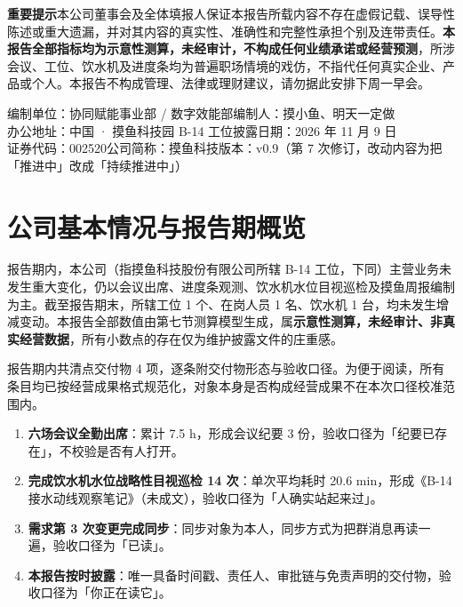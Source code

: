 \documentclass[11pt,a4paper]{article}
\begin{document}
\begin{titlepage}
\vspace{10mm}
\begin{minipage}{0.88\textwidth}\small 
\textcolor{reportred}{\bfseries 重要提示}\quad 本公司董事会及全体填报人保证本报告所载内容不存在虚假记载、误导性陈述或重大遗漏，并对其内容的真实性、准确性和完整性承担个别及连带责任。\textbf{本报告全部指标均为示意性测算，未经审计，不构成任何业绩承诺或经营预测}，所涉会议、工位、饮水机及进度条均为普遍职场情境的戏仿，不指代任何真实企业、产品或个人。本报告不构成管理、法律或理财建议，请勿据此安排下周一早会。
\end{minipage}\par\vfill
\begin{minipage}{0.88\textwidth}\footnotesize\raggedright
编制单位：协同赋能事业部 / 数字效能部\quad 编制人：摸小鱼、明天一定做\\
办公地址：中国 · 摸鱼科技园 B-14 工位\quad 披露日期：2026 年 11 月 9 日\\
证券代码：002520\quad 公司简称：摸鱼科技\quad 版本：v0.9（第 7 次修订，改动内容为把「推进中」改成「持续推进中」）
\end{minipage}
\end{titlepage}
\newpage
\tableofcontents
\newpage

\section{公司基本情况与报告期概览}
报告期内，本公司（指摸鱼科技股份有限公司所辖 B-14 工位，下同）主营业务未发生重大变化，仍以会议出席、进度条观测、饮水机水位目视巡检及摸鱼周报编制为主。截至报告期末，所辖工位 1 个、在岗人员 1 名、饮水机 1 台，均未发生增减变动。本报告全部数值由第七节测算模型生成，属\textbf{示意性测算，未经审计、非真实经营数据}，所有小数点的存在仅为维护披露文件的庄重感。

报告期内共清点交付物 4 项，逐条附交付物形态与验收口径。为便于阅读，所有条目均已按经营成果格式规范化，对象本身是否构成经营成果不在本次口径校准范围内。

\begin{enumerate}
\item \textbf{六场会议全勤出席}：累计 7.5 h，形成会议纪要 3 份，验收口径为「纪要已存在」，不校验是否有人打开。
\item \textbf{完成饮水机水位战略性目视巡检 14 次}：单次平均耗时 20.6 min，形成《B-14 接水动线观察笔记》（未成文），验收口径为「人确实站起来过」。
\item \textbf{需求第 3 次变更完成同步}：同步对象为本人，同步方式为把群消息再读一遍，验收口径为「已读」。
\item \textbf{本报告按时披露}：唯一具备时间戳、责任人、审批链与免责声明的交付物，验收口径为「你正在读它」。
\end{enumerate}
\end{document}
